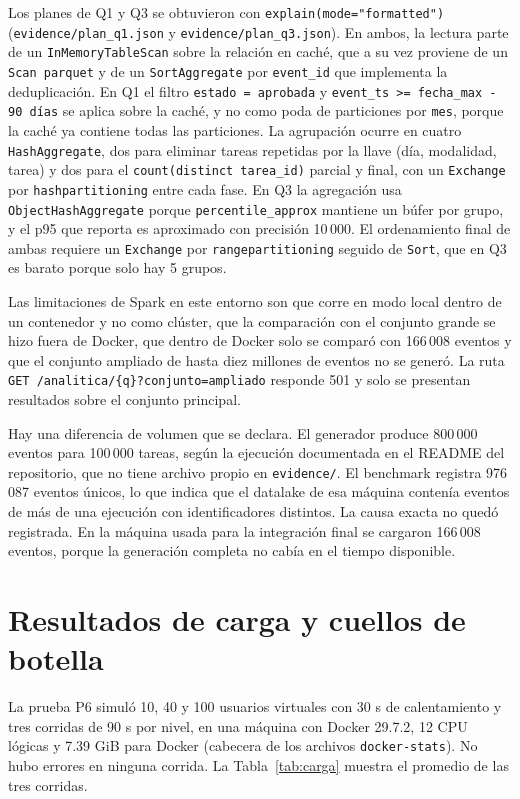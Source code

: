\documentclass[conference]{IEEEtran}
\begin{document}
Los planes de Q1 y Q3 se obtuvieron con \texttt{explain(mode="formatted")} (\texttt{evidence/plan\_q1.json} y \texttt{evidence/plan\_q3.json}). En ambos, la lectura parte de un \texttt{InMemoryTableScan} sobre la relación en caché, que a su vez proviene de un \texttt{Scan parquet} y de un \texttt{SortAggregate} por \texttt{event\_id} que implementa la deduplicación. En Q1 el filtro \texttt{estado = aprobada} y \texttt{event\_ts >= fecha\_max - 90 días} se aplica sobre la caché, y no como poda de particiones por \texttt{mes}, porque la caché ya contiene todas las particiones. La agrupación ocurre en cuatro \texttt{HashAggregate}, dos para eliminar tareas repetidas por la llave (día, modalidad, tarea) y dos para el \texttt{count(distinct tarea\_id)} parcial y final, con un \texttt{Exchange} por \texttt{hashpartitioning} entre cada fase. En Q3 la agregación usa \texttt{ObjectHashAggregate} porque \texttt{percentile\_approx} mantiene un búfer por grupo, y el p95 que reporta es aproximado con precisión 10\,000. El ordenamiento final de ambas requiere un \texttt{Exchange} por \texttt{rangepartitioning} seguido de \texttt{Sort}, que en Q3 es barato porque solo hay 5 grupos.

Las limitaciones de Spark en este entorno son que corre en modo local dentro de un contenedor y no como clúster, que la comparación con el conjunto grande se hizo fuera de Docker, que dentro de Docker solo se comparó con 166\,008 eventos y que el conjunto ampliado de hasta diez millones de eventos no se generó. La ruta \texttt{GET /analitica/\{q\}?conjunto=ampliado} responde 501 y solo se presentan resultados sobre el conjunto principal.

Hay una diferencia de volumen que se declara. El generador produce 800\,000 eventos para 100\,000 tareas, según la ejecución documentada en el README del repositorio, que no tiene archivo propio en \texttt{evidence/}. El benchmark registra 976\,087 eventos únicos, lo que indica que el datalake de esa máquina contenía eventos de más de una ejecución con identificadores distintos. La causa exacta no quedó registrada. En la máquina usada para la integración final se cargaron 166\,008 eventos, porque la generación completa no cabía en el tiempo disponible.

\section{Resultados de carga y cuellos de botella}

La prueba P6 simuló 10, 40 y 100 usuarios virtuales con 30 s de calentamiento y tres corridas de 90 s por nivel, en una máquina con Docker 29.7.2, 12 CPU lógicas y 7.39 GiB para Docker (cabecera de los archivos \texttt{docker-stats}). No hubo errores en ninguna corrida. La Tabla~\ref{tab:carga} muestra el promedio de las tres corridas.
\end{document}
